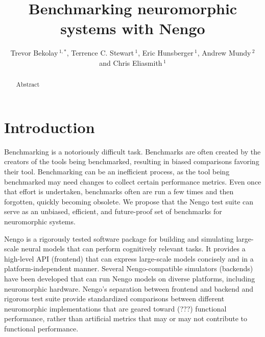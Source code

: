 \documentclass{frontiersSCNS}
\def\keyFont{\fontsize{8}{11}\helveticabold }
\def\firstAuthorLast{Bekolay {et~al.}}
\def\Authors{Trevor Bekolay\,$^{1,*}$,
  Terrence C. Stewart\,$^{1}$,
  Eric Hunsberger\,$^1$,
  Andrew Mundy\,$^2$ and
  Chris Eliasmith\,$^1$}
\begin{document}
\onecolumn
{}

\title[Benchmarking neuromorphic systems with Nengo]{Benchmarking neuromorphic systems with Nengo}
\author[\firstAuthorLast ]{\Authors}
\address{}
\correspondance{}
\extraAuth{}

\maketitle

\begin{abstract}

  Abstract

  \tiny
  \keyFont{ \section{Keywords:}  }
\end{abstract}

\section{Introduction}

Benchmarking is a notoriously difficult task.
Benchmarks are often created by
the creators of the tools being benchmarked,
resulting in biased comparisons favoring their tool.
Benchmarking can be an inefficient process,
as the tool being benchmarked
may need changes to collect
certain performance metrics.
Even once that effort is undertaken,
benchmarks often are run a few times
and then forgotten,
quickly becoming obsolete.
We propose that the Nengo test suite
can serve as an unbiased, efficient, and future-proof
set of benchmarks for neuromorphic systems.

Nengo is a rigorously tested software package
for building and simulating
large-scale neural models
that can perform cognitively relevant tasks.
It provides a high-level API (frontend)
that can express large-scale models concisely
and in a platform-independent manner.
Several Nengo-compatible simulators (backends)
have been developed that can
run Nengo models on diverse platforms,
including neuromorphic hardware.
Nengo's separation between frontend and backend
and rigorous test suite
provide standardized comparisons
between different neuromorphic implementations
that are geared toward (???) functional performance,
rather than artificial metrics
that may or may not contribute to functional performance.
\end{document}
